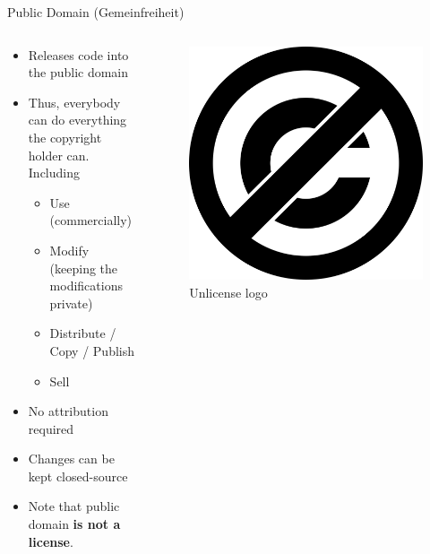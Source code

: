 \documentclass[compress,aspectratio=169]{beamer}
\begin{document}
  \begin{frame}{Public Domain (Gemeinfreiheit)}
    \begin{columns}
      \begin{column}{0.5\textwidth}
    \begin{itemize}
      \item Releases code into the public domain
      \item Thus, everybody can do everything the copyright holder can. Including
        \begin{itemize}
          \item Use (commercially)
          \item Modify (keeping the modifications private)
          \item Distribute / Copy / Publish
          \item Sell
        \end{itemize}
      \item No attribution required
      \item Changes can be kept closed-source
      \item Note that public domain \textbf{is not a license}.
    \end{itemize}
      \end{column}
      \begin{column}{0.5\textwidth}
        \begin{figure}
          \includegraphics[width=.5\textwidth]{./assets/unlicense.png}
          \caption{Unlicense logo \cite{unlicense}}
        \end{figure}
      \end{column}
    \end{columns}
  \end{frame}
\end{document}
